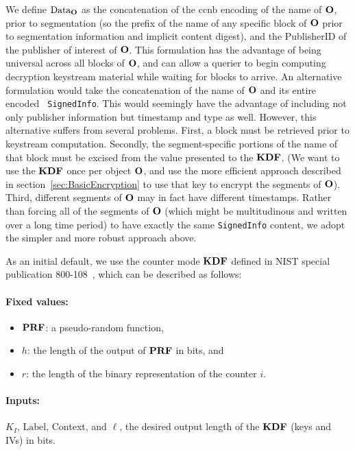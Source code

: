 We define $\mbox{Data}_{{\textbf{O}}}$ as the concatenation of the ccnb
encoding of the name of ${\textbf{O}}$, prior to segmentation (so the prefix
of the name of any specific block of ${\textbf{O}}$ prior to segmentation
information and implicit content digest), and the PublisherID of the
publisher of interest of ${\textbf{O}}$. This formulation has the advantage of
being universal across all blocks of ${\textbf{O}}$, and can allow a querier
to begin computing decryption keystream material while waiting for
blocks to arrive. An alternative formulation would take the
concatenation of the name of ${\textbf{O}}$ and its entire encoded {\tt
  SignedInfo}. This would seemingly have the advantage of including
not only publisher information but timestamp and type as
well. However, this alternative suffers from several problems. First,
a block must be retrieved prior to keystream computation. Secondly,
the segment-specific portions of the name of that block must be
excised from the value presented to the ${\textbf{KDF}}$. (We want to use the
${\textbf{KDF}}$ once per object ${\textbf{O}}$, and use the more efficient approach
described in section~\ref{sec:BasicEncryption} to use that key to
encrypt the segments of ${\textbf{O}}$). Third, different segments of ${\textbf{O}}$
may in fact have different timestamps. Rather than forcing all of the
segments of ${\textbf{O}}$ (which might be multitudinous and written over a
long time period) to have exactly the same {\tt SignedInfo} content,
we adopt the simpler and more robust approach above.

As an initial default, we use the counter mode ${\textbf{KDF}}$ defined in NIST
special publication 800-108~\cite{Chen2009}, which can be described as
follows:

\paragraph{Fixed values:}
\begin{itemize}
\item ${\textbf{PRF}}$: a pseudo-random function,
\item $h$: the length of the output of ${\textbf{PRF}}$ in bits, and
\item $r$: the length of the binary representation of the counter $i$. 
\end{itemize}

\paragraph{Inputs:} $K_I$, $\mbox{Label}$, Context, and $\ell$, the desired output length of the ${\textbf{KDF}}$ (keys and IVs) in bits.


